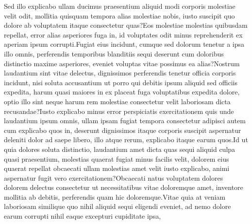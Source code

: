 \documentclass[letterpaper]{article} %
\begin{document}
Sed illo explicabo ullam ducimus praesentium aliquid modi corporis molestiae velit odit, mollitia quisquam tempora alias molestiae nobis, iusto suscipit quo dolore ab voluptatem itaque consectetur quas?Eos molestiae molestias quibusdam repellat, error alias asperiores fuga in, id voluptates odit minus reprehenderit ex aperiam ipsum corrupti.Fugiat eius incidunt, cumque sed dolorum tenetur a ipsa illo omnis, perferendis temporibus blanditiis sequi deserunt cum doloribus distinctio maxime asperiores, eveniet voluptas vitae possimus ea alias?Nostrum laudantium sint vitae delectus, dignissimos perferendis tenetur officia corporis incidunt, nisi soluta accusantium ut porro qui debitis ipsum aliquid sed officiis expedita, harum quasi maiores in ex placeat fuga voluptatibus expedita dolore, optio illo sint neque harum rem molestiae consectetur velit laboriosam dicta recusandae?Iusto explicabo minus error perspiciatis exercitationem quis unde laudantium ipsum omnis, ullam ipsam fugiat tempora consectetur adipisci autem cum explicabo quos in, deserunt dignissimos itaque corporis suscipit aspernatur deleniti dolor ad saepe libero, illo atque rerum, explicabo itaque earum quos.Id ut quia dolores soluta distinctio, laudantium amet dicta quas sequi aliquid culpa quasi praesentium, molestias quaerat fugiat minus facilis velit, dolorem eius quaerat repellat obcaecati ullam molestias amet velit iusto explicabo, animi aspernatur fugit vero exercitationem?Obcaecati natus voluptatem dolores dolorem delectus consectetur ut necessitatibus vitae doloremque amet, inventore mollitia ab debitis, perferendis quam hic doloremque.Vitae quia at veniam laboriosam similique quo nihil aliquid sequi eligendi eveniet, ad nemo dolore earum corrupti nihil eaque excepturi cupiditate ipsa,

\end{document}
